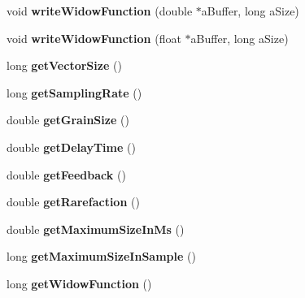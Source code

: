 \begin{DoxyCompactItemize}
\item 
\hypertarget{class_cicm_qsgs_a78ff51fa1042a949610a4860f42acbac}{void {\bfseries write\-Widow\-Function} (double $\ast$a\-Buffer, long a\-Size)}\label{class_cicm_qsgs_a78ff51fa1042a949610a4860f42acbac}

\item 
\hypertarget{class_cicm_qsgs_a359e762f72f7e3e51e8dd0d2f5dd9055}{void {\bfseries write\-Widow\-Function} (float $\ast$a\-Buffer, long a\-Size)}\label{class_cicm_qsgs_a359e762f72f7e3e51e8dd0d2f5dd9055}

\item 
\hypertarget{class_cicm_qsgs_a4f463be45de44f6d9e88e4ce65bdf730}{long {\bfseries get\-Vector\-Size} ()}\label{class_cicm_qsgs_a4f463be45de44f6d9e88e4ce65bdf730}

\item 
\hypertarget{class_cicm_qsgs_ad4556ba39fb411bcf4e08283b0def211}{long {\bfseries get\-Sampling\-Rate} ()}\label{class_cicm_qsgs_ad4556ba39fb411bcf4e08283b0def211}

\item 
\hypertarget{class_cicm_qsgs_a02e6dcfad34ac520081aaea664750848}{double {\bfseries get\-Grain\-Size} ()}\label{class_cicm_qsgs_a02e6dcfad34ac520081aaea664750848}

\item 
\hypertarget{class_cicm_qsgs_a2627238381097d861eb5bc6b5cc7088a}{double {\bfseries get\-Delay\-Time} ()}\label{class_cicm_qsgs_a2627238381097d861eb5bc6b5cc7088a}

\item 
\hypertarget{class_cicm_qsgs_abe8b134865a49ff203d593e96be9a660}{double {\bfseries get\-Feedback} ()}\label{class_cicm_qsgs_abe8b134865a49ff203d593e96be9a660}

\item 
\hypertarget{class_cicm_qsgs_aef651c548592cd63f7ab337b5c5474f6}{double {\bfseries get\-Rarefaction} ()}\label{class_cicm_qsgs_aef651c548592cd63f7ab337b5c5474f6}

\item 
\hypertarget{class_cicm_qsgs_a8ec7944d12510911b8f13cea1721853f}{double {\bfseries get\-Maximum\-Size\-In\-Ms} ()}\label{class_cicm_qsgs_a8ec7944d12510911b8f13cea1721853f}

\item 
\hypertarget{class_cicm_qsgs_a8060af39d00813955122830a9e134266}{long {\bfseries get\-Maximum\-Size\-In\-Sample} ()}\label{class_cicm_qsgs_a8060af39d00813955122830a9e134266}

\item 
\hypertarget{class_cicm_qsgs_a56096e348fb11b89aea7b16511d761ba}{long {\bfseries get\-Widow\-Function} ()}\label{class_cicm_qsgs_a56096e348fb11b89aea7b16511d761ba}


\end{DoxyCompactItemize}
